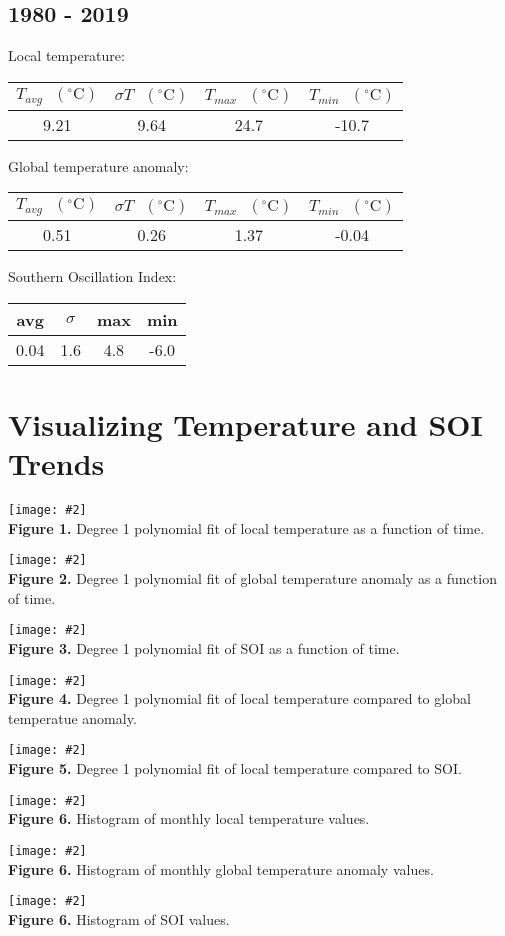 \documentclass[12pt]{article}
\newcommand{\img}[4]{
 \begin{center}
 \texttt{[image: \#2]} \\
 \textbf{Figure #3.} #4
 \end{center}
}
\begin{document}
\subsection*{1980 - 2019}
Local temperature:
\begin{center}
\begin{tabular}{c | c | c | c}
	$T_{avg} \textrm{ } (^{\circ} \textrm{C})$ &
	$\sigma T \textrm{ } (^{\circ} \textrm{C})$ &
	$T_{max} \textrm{ } (^{\circ} \textrm{C})$ &
	$T_{min} \textrm{ } (^{\circ} \textrm{C})$ \\ %
	\hline
	9.21 & 9.64 & 24.7 & -10.7 \\ %
\end{tabular}
\end{center}
Global temperature anomaly:
\begin{center}
\begin{tabular}{c | c | c | c}
	$T_{avg} \textrm{ } (^{\circ} \textrm{C})$ &
	$\sigma T \textrm{ } (^{\circ} \textrm{C})$ &
	$T_{max} \textrm{ } (^{\circ} \textrm{C})$ &
	$T_{min} \textrm{ } (^{\circ} \textrm{C})$ \\ %
	\hline
	0.51 & 0.26 & 1.37 & -0.04 \\ %
\end{tabular}
\end{center}
Southern Oscillation Index:
\begin{center}
\begin{tabular}{c | c | c | c}
	avg & $\sigma$ & max & min \\ %
	\hline
	0.04 & 1.6 & 4.8 & -6.0 \\ %
\end{tabular}
\end{center}

\section*{Visualizing Temperature and SOI Trends}
\img{0.65}{../plots/fits/local.png}{1}{
	Degree 1 polynomial fit of local temperature as a
	function of time.
}
\img{0.65}{../plots/fits/global.png}{2}{
	Degree 1 polynomial fit of global temperature anomaly as a
	function of time.
}
\img{0.65}{../plots/fits/soi.png}{3}{
	Degree 1 polynomial fit of SOI as a
	function of time.
}
\img{0.65}{../plots/compare/local_vs_global.png}{4}{
	Degree 1 polynomial fit of local temperature compared
	to global temperatue anomaly.
}
\img{0.65}{../plots/compare/local_vs_soi.png}{5}{
	Degree 1 polynomial fit of local temperature compared
	to SOI.
}
\img{0.65}{../plots/histogram/local.png}{6}{
	Histogram of monthly local temperature values.
}
\img{0.65}{../plots/histogram/global.png}{6}{
	Histogram of monthly global temperature anomaly values.
}
\img{0.65}{../plots/histogram/soi.png}{6}{
	Histogram of SOI values.
}
\end{document}
